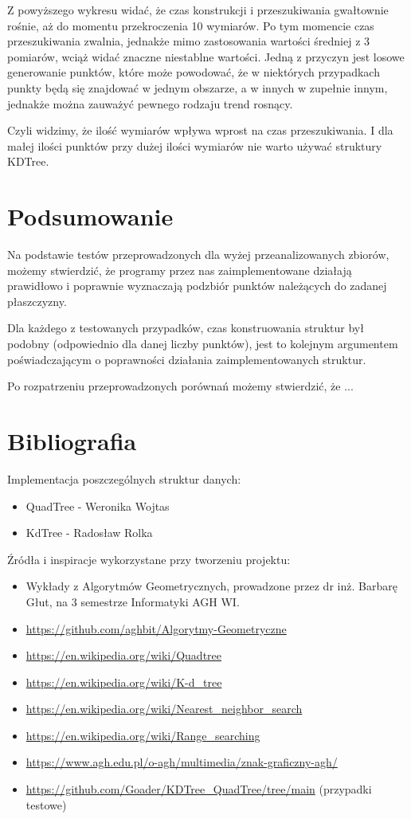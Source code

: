 \documentclass{lab}
\begin{document}
Z powyższego wykresu widać, że czas konstrukcji i przeszukiwania gwałtownie rośnie, aż do momentu przekroczenia 10 wymiarów.
Po tym momencie czas przeszukiwania zwalnia, jednakże mimo zastosowania wartości średniej z 3 pomiarów, wciąż widać znaczne niestablne wartości.
Jedną z przyczyn jest losowe generowanie punktów, które może powodować, że w niektórych przypadkach punkty będą się znajdować w jednym obszarze, a w innych w zupełnie innym, jednakże 
można zauważyć pewnego rodzaju trend rosnący. 

Czyli widzimy, że ilość wymiarów wpływa wprost na czas przeszukiwania. I dla małej ilości punktów przy
dużej ilości wymiarów nie warto używać struktury KDTree.

\section{Podsumowanie}
Na podstawie testów przeprowadzonych dla wyżej przeanalizowanych zbiorów, możemy
stwierdzić, że programy przez nas zaimplementowane działają prawidłowo i poprawnie wyznaczają podzbiór punktów należących do zadanej płaszczyzny. 

Dla każdego z testowanych przypadków, czas konstruowania struktur był podobny (odpowiednio dla danej liczby punktów), jest to kolejnym argumentem poświadczającym o poprawności działania zaimplementowanych struktur. 

Po rozpatrzeniu przeprowadzonych porównań możemy stwierdzić, że ...

\newpage
\section{Bibliografia}
Implementacja poszczególnych struktur danych:
\begin{itemize}
  \item QuadTree - Weronika Wojtas
  \item KdTree - Radosław Rolka
\end{itemize}

Źródła i inspiracje wykorzystane przy tworzeniu projektu:
\begin{itemize}
  \item Wykłady z Algorytmów Geometrycznych, prowadzone przez dr inż. Barbarę Głut, na 3 semestrze Informatyki AGH WI.
  \item \url{https://github.com/aghbit/Algorytmy-Geometryczne}
  \item \url{https://en.wikipedia.org/wiki/Quadtree}
  \item \url{https://en.wikipedia.org/wiki/K-d_tree}
  \item \url{https://en.wikipedia.org/wiki/Nearest_neighbor_search}
  \item \url{https://en.wikipedia.org/wiki/Range_searching}
  \item \url{https://www.agh.edu.pl/o-agh/multimedia/znak-graficzny-agh/}
  \item \url{https://github.com/Goader/KDTree_QuadTree/tree/main} (przypadki testowe)
\end{itemize}
\end{document}
